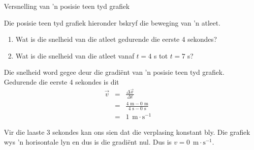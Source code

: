 \begin{wex}{Versnelling van 'n posisie teen tyd grafiek}{Die posisie teen tyd grafiek hieronder bskryf die beweging van 'n atleet.\\
\begin{center}
\end{center}\begin{enumerate}[label=\textbf{\arabic*}.]
\item Wat is die snelheid van die atleet gedurende die eerste 4 sekondes?
\item Wat is die snelheid van die atleet vanaf $t=4$ s tot $t=7$ s?
\end{enumerate}}
{
Die snelheid word gegee deur die gradi\"ent van 'n posisie teen tyd grafiek. Gedurende die eerste 4 sekondes is dit
\begin{eqnarray*}
\vec{v}&=&\frac{\Delta \vec{x}}{\Delta t}\\
&=&\frac{4\text{~m} - 0\text{~m}}{4\text{~s} - 0\text{~s}}\\
&=&1\ ~\text{m}\cdot \text{s}^{-1}
\end{eqnarray*}

Vir die laaste 3 sekondes kan ons sien dat die verplasing konstant bly. Die grafiek wys 'n horisontale lyn en dus is die gradi\"ent nul. Dus is ${v}=0\ ~\text{m}\cdot \text{s}^{-1}$.}
\end{wex} 
    \noindent 

